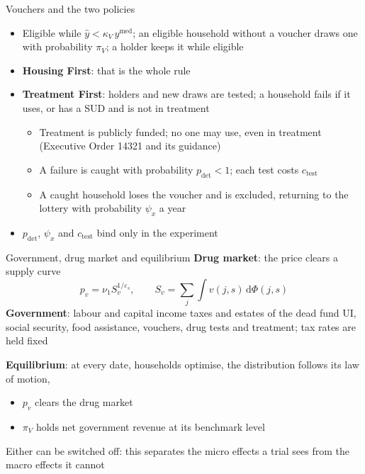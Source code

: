 \documentclass[aspectratio=169,11pt]{beamer}
\newcommand{\HF}{Housing First}
\newcommand{\TF}{Treatment First}
\begin{document}
\begin{frame}{Vouchers and the two policies}
\begin{itemize}\setlength\itemsep{0.4em}
\item Eligible while $\hat y<\kappa_V\,y^{\text{med}}$; an eligible household without a voucher draws one with probability $\pi_V$; a holder keeps it while eligible
\item \textbf{\HF{}}: that is the whole rule
\item \textbf{\TF{}}: holders and new draws are tested; a household fails if it uses, or has a SUD and is not in treatment
\begin{itemize}
\item Treatment is publicly funded; no one may use, even in treatment (Executive Order 14321 and its guidance)
\item A failure is caught with probability $p_{\text{det}}<1$; each test costs $c_{\text{test}}$
\item A caught household loses the voucher and is excluded, returning to the lottery with probability $\psi_x$ a year
\end{itemize}
\item $p_{\text{det}}$, $\psi_x$ and $c_{\text{test}}$ bind only in the experiment
\end{itemize}
\end{frame}

\begin{frame}{Government, drug market and equilibrium}
\textbf{Drug market}: the price clears a supply curve
\[
p_v=\nu_1 S_v^{1/\varepsilon_s},\qquad S_v=\sum_j\int v(j,s)\,\mathrm{d}\Phi(j,s)
\]
\textbf{Government}: labour and capital income taxes and estates of the dead fund UI, social security, food assistance, vouchers, drug tests and treatment; tax rates are held fixed
\vspace{0.3cm}

\textbf{Equilibrium}: at every date, households optimise, the distribution follows its law of motion,
\begin{itemize}
\item $p_v$ clears the drug market
\item $\pi_V$ holds net government revenue at its benchmark level
\end{itemize}
\vspace{0.2cm}
Either can be switched off: this separates the micro effects a trial sees from the macro effects it cannot
\end{frame}
\end{document}
